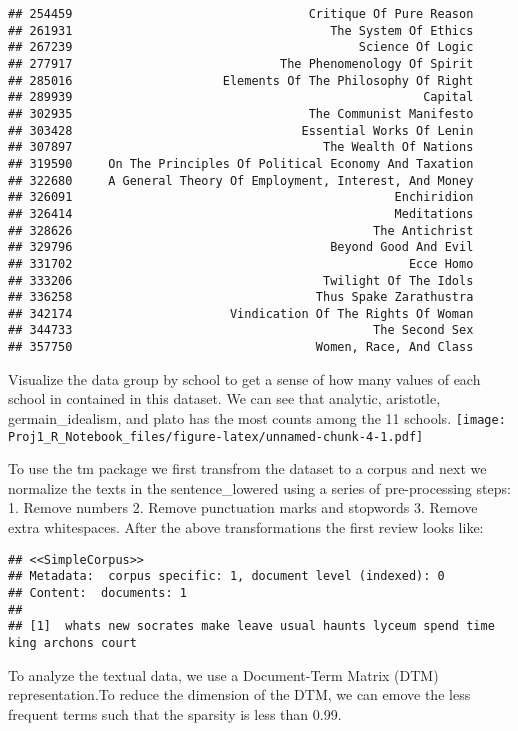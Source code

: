 \documentclass[
]{article}
\begin{document}
\begin{verbatim}
## 254459                                 Critique Of Pure Reason
## 261931                                    The System Of Ethics
## 267239                                        Science Of Logic
## 277917                             The Phenomenology Of Spirit
## 285016                     Elements Of The Philosophy Of Right
## 289939                                                 Capital
## 302935                                 The Communist Manifesto
## 303428                                Essential Works Of Lenin
## 307897                                   The Wealth Of Nations
## 319590     On The Principles Of Political Economy And Taxation
## 322680     A General Theory Of Employment, Interest, And Money
## 326091                                             Enchiridion
## 326414                                             Meditations
## 328626                                          The Antichrist
## 329796                                    Beyond Good And Evil
## 331702                                               Ecce Homo
## 333206                                   Twilight Of The Idols
## 336258                                  Thus Spake Zarathustra
## 342174                      Vindication Of The Rights Of Woman
## 344733                                          The Second Sex
## 357750                                  Women, Race, And Class
\end{verbatim}

Visualize the data group by school to get a sense of how many values of
each school in contained in this dataset. We can see that analytic,
aristotle, germain\_idealism, and plato has the most counts among the 11
schools.
\texttt{[image: Proj1\_R\_Notebook\_files/figure-latex/unnamed-chunk-4-1.pdf]}

To use the tm package we first transfrom the dataset to a corpus and
next we normalize the texts in the sentence\_lowered using a series of
pre-processing steps: 1. Remove numbers 2. Remove punctuation marks and
stopwords 3. Remove extra whitespaces. After the above transformations
the first review looks like:

\begin{verbatim}
## <<SimpleCorpus>>
## Metadata:  corpus specific: 1, document level (indexed): 0
## Content:  documents: 1
## 
## [1]  whats new socrates make leave usual haunts lyceum spend time king archons court
\end{verbatim}

To analyze the textual data, we use a Document-Term Matrix (DTM)
representation.To reduce the dimension of the DTM, we can emove the less
frequent terms such that the sparsity is less than 0.99.
\end{document}
